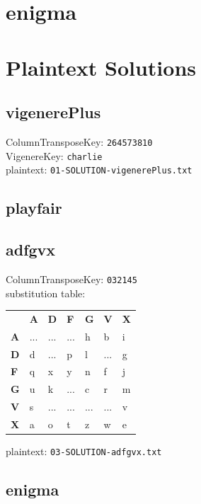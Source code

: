 \documentclass{article}
\begin{document}
\section{enigma}
\section{Plaintext Solutions}
\subsection{vigenerePlus}
ColumnTransposeKey: \texttt{264573810}\\
VigenereKey: \texttt{charlie}\\
plaintext: \texttt{01-SOLUTION-vigenerePlus.txt}
\subsection{playfair}
\subsection{adfgvx}
ColumnTransposeKey: \texttt{032145}\\
substitution table:
\\
\begin{table}[H]
\begin{tabular}{lllllll}
\textbf{} &
  \textbf{A} &
  \textbf{D} &
  \textbf{F} &
  \textbf{G} &
  \textbf{V} &
  \textbf{X} \\ \cline{2-7}
\multicolumn{1}{l|}{\textbf{A}} &
  \multicolumn{1}{l|}{...} &
  \multicolumn{1}{l|}{...} &
  \multicolumn{1}{l|}{...} &
  \multicolumn{1}{l|}{h} &
  \multicolumn{1}{l|}{b} &
  \multicolumn{1}{l|}{i} \\ \cline{2-7}
\multicolumn{1}{l|}{\textbf{D}} &
  \multicolumn{1}{l|}{d} &
  \multicolumn{1}{l|}{...} &
  \multicolumn{1}{l|}{p} &
  \multicolumn{1}{l|}{l} &
  \multicolumn{1}{l|}{...} &
  \multicolumn{1}{l|}{g} \\ \cline{2-7}
\multicolumn{1}{l|}{\textbf{F}} &
  \multicolumn{1}{l|}{q} &
  \multicolumn{1}{l|}{x} &
  \multicolumn{1}{l|}{y} &
  \multicolumn{1}{l|}{n} &
  \multicolumn{1}{l|}{f} &
  \multicolumn{1}{l|}{j} \\ \cline{2-7}
\multicolumn{1}{l|}{\textbf{G}} &
  \multicolumn{1}{l|}{u} &
  \multicolumn{1}{l|}{k} &
  \multicolumn{1}{l|}{...} &
  \multicolumn{1}{l|}{c} &
  \multicolumn{1}{l|}{r} &
  \multicolumn{1}{l|}{m} \\ \cline{2-7}
\multicolumn{1}{l|}{\textbf{V}} &
  \multicolumn{1}{l|}{s} &
  \multicolumn{1}{l|}{...} &
  \multicolumn{1}{l|}{...} &
  \multicolumn{1}{l|}{...} &
  \multicolumn{1}{l|}{...} &
  \multicolumn{1}{l|}{v} \\ \cline{2-7}
\multicolumn{1}{l|}{\textbf{X}} &
  \multicolumn{1}{l|}{a} &
  \multicolumn{1}{l|}{o} &
  \multicolumn{1}{l|}{t} &
  \multicolumn{1}{l|}{z} &
  \multicolumn{1}{l|}{w} &
  \multicolumn{1}{l|}{e} \\ \cline{2-7}
\end{tabular}
\end{table}
plaintext: \texttt{03-SOLUTION-adfgvx.txt}
\subsection{enigma}
\end{document}
